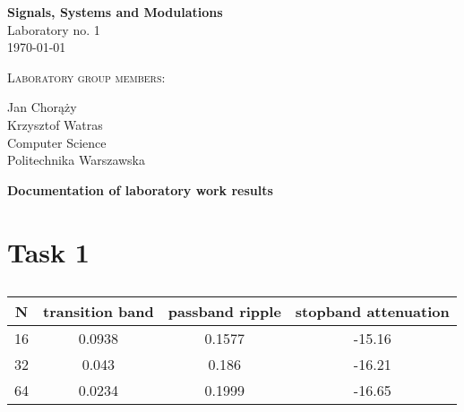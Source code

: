 \documentclass{article}
\begin{document}
\begin{titlepage}
   \begin{center}
       \vspace*{1cm}

       \textbf{\Huge Signals, Systems and Modulations} \\
        \vspace{2.0cm}
        \huge{Laboratory no. 1}
         \vspace{.7cm}
       \huge{\\ \today}

        \vspace{3.0cm}
        \textsc{Laboratory group members:}
        
        \vspace{0.4cm}
        Jan Chorąży\\
         \vspace{0.4cm}
        Krzysztof Watras\\

     
         
        \vspace{2 cm}   
       \small{Computer Science} \\  
       \vspace{0.2cm}       
       \small{Politechnika Warszawska} 
       \date{\today}
            
   \end{center}
\end{titlepage} 

\begin{center}
\textbf{\Large  Documentation of laboratory work results }\\ 
\end{center}

\section*{Task 1}
\begin{table}[h!]
  \begin{center}
    \caption{}
    \label{tab:task1tab}
    \begin{tabular}{c|c|c|c} 
      \textbf{N} & \textbf{transition band} & \textbf{passband ripple} 
      & \textbf{stopband attenuation} \\
      \hline
        16 & 0.0938 & 0.1577 & -15.16 \\
        32 & 0.043  & 0.186  & -16.21 \\
        64 & 0.0234 & 0.1999 & -16.65 \\
    \end{tabular}
  \end{center}
\end{table}
\end{document}
